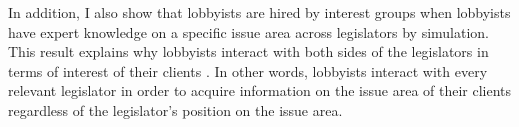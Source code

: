 \documentclass{article}
\begin{document}
In addition, 
I also show that 
lobbyists are hired by interest groups 
when lobbyists have
expert knowledge on a specific issue area across 
legislators by simulation.
This result explains 
why lobbyists interact 
with both sides of the legislators
in terms of interest of their clients
\citep{10.2307/2586303}.
In other words, 
lobbyists interact with 
every relevant legislator 
in order to acquire information
on the issue area of their clients
regardless of the legislator's position on the issue area.











\end{document}
